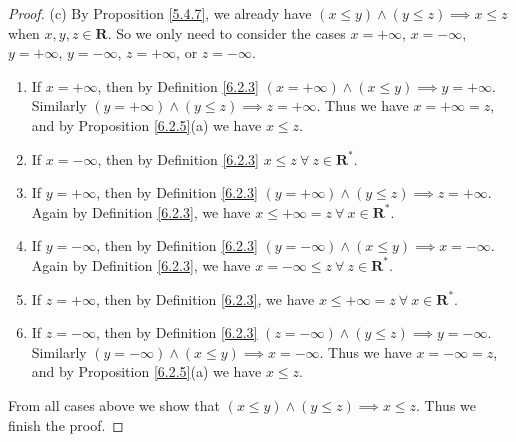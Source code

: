 \begin{proof}{(c)}
    By Proposition \ref{5.4.7}, we already have \((x \leq y) \land (y \leq z) \implies x \leq z\) when \(x, y, z \in \mathbf{R}\).
    So we only need to consider the cases \(x = +\infty\), \(x = -\infty\), \(y = +\infty\), \(y = -\infty\), \(z = +\infty\), or \(z = -\infty\).
    \begin{enumerate}[label=(\Roman*)]
        \item If \(x = +\infty\), then by Definition \ref{6.2.3} \((x = +\infty) \land (x \leq y) \implies y = +\infty\).
              Similarly \((y = +\infty) \land (y \leq z) \implies z = +\infty\).
              Thus we have \(x = +\infty = z\), and by Proposition \ref{6.2.5}(a) we have \(x \leq z\).
        \item If \(x = -\infty\), then by Definition \ref{6.2.3} \(x \leq z \ \forall\ z \in \mathbf{R}^*\).
        \item If \(y = +\infty\), then by Definition \ref{6.2.3} \((y = +\infty) \land (y \leq z) \implies z = +\infty\).
              Again by Definition \ref{6.2.3}, we have \(x \leq +\infty = z \ \forall\ x \in \mathbf{R}^*\).
        \item If \(y = -\infty\), then by Definition \ref{6.2.3} \((y = -\infty) \land (x \leq y) \implies x = -\infty\).
              Again by Definition \ref{6.2.3}, we have \(x = -\infty \leq z \ \forall\ z \in \mathbf{R}^*\).
        \item If \(z = +\infty\), then by Definition \ref{6.2.3}, we have \(x \leq +\infty = z \ \forall\ x \in \mathbf{R}^*\).
        \item If \(z = -\infty\), then by Definition \ref{6.2.3} \((z = -\infty) \land (y \leq z) \implies y = -\infty\).
              Similarly \((y = -\infty) \land (x \leq y) \implies x = -\infty\).
              Thus we have \(x = -\infty = z\), and by Proposition \ref{6.2.5}(a) we have \(x \leq z\).
    \end{enumerate}
    From all cases above we show that \((x \leq y) \land (y \leq z) \implies x \leq z\).
    Thus we finish the proof.
\end{proof}

